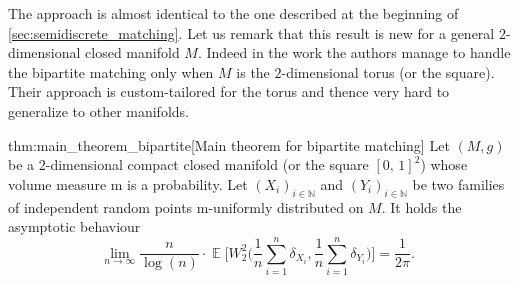 \documentclass[10pt]{amsart}
\theoremstyle{plain}
\theoremstyle{definition}
\numberwithin{equation}{section}
\newcommand{\NN}{\ensuremath{\mathbb N}}
\newcommand{\bbE}[1]{\ensuremath{\operatorname{\mathbb{E}}\biggl[#1\biggr]}}
\newcommand{\cc}[2]{\ensuremath{\left[#1,\,#2\right]}}
\newcommand{\fullstop}{\ensuremath{\text{. }}}
\newcommand{\m}{\ensuremath{\mathrm m}}
\newcommand{\metric}{\ensuremath{g}}
\begin{document}
The approach is almost identical to the one described at the beginning of \cref{sec:semidiscrete_matching}.
Let us remark that this result is new for a general $2$-dimensional closed manifold $M$.
Indeed in the work \cite{Ambrosio-Stra-Trevisan2018} the authors manage to handle the bipartite
matching only when $M$ is the $2$-dimensional torus (or the square).
Their approach is custom-tailored for the torus and thence very hard to generalize to other manifolds.

\begin{reptheorem}{thm:main_theorem_bipartite}[Main theorem for bipartite matching]
Let $(M,\metric)$ be a $2$\nobreakdash-dimensional compact closed manifold (or the square $\cc01^2$) whose volume
measure $\m$ is a probability.
Let $(X_i)_{i\in\NN}$ and $(Y_i)_{i\in\NN}$ be two families of independent random points
$\m$-uniformly distributed on $M$.
It holds the asymptotic behaviour
\begin{equation*}
\lim_{n\to\infty} \frac{n}{\log(n)}\cdot
\bbE{W^2_2\biggl(\frac1n\sum_{i=1}^n\delta_{X_i}, \frac1n\sum_{i=1}^n\delta_{Y _i}\biggr)}
=\frac1{2\pi} \fullstop
\end{equation*}
\end{reptheorem}
\end{document}
